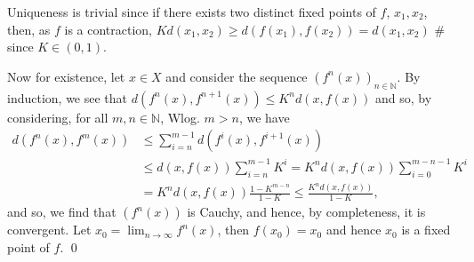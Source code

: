 \documentclass[
]{article}
\theoremstyle{definition}
\theoremstyle{definition}
\begin{document}
Uniqueness is trivial since if there exists two distinct fixed points of
\(f\), \(x_1, x_2\), then, as \(f\) is a contraction,
\(K d(x_1, x_2) \ge  d(f(x_1), f(x_2)) = d(x_1, x_2)\) \# since
\(K \in (0, 1)\).

Now for existence, let \(x \in X\) and consider the sequence
\((f^n(x))_{n \in \mathbb{N}}\). By induction, we see that
\(d(f^n(x), f^{n + 1}(x)) \le K^nd(x, f(x))\) and so, by considering,
for all \(m, n \in \mathbb{N}\), Wlog. \(m > n\), we have \begin{align*}
    d(f^n(x), f^m(x)) & \le \sum_{i = n}^{m - 1} d(f^i(x), f^{i + 1}(x)) \\
      & \le d(x, f(x)) \sum_{i = n}^{m - 1} K^i = K^n d(x, f(x)) \sum_{i = 0}^{m - n - 1} K^i\\
      & = K^n d(x, f(x))\frac{1 - K^{m - n}}{1 - K} \le \frac{K^n d(x, f(x))}{1 - K},
  \end{align*} and so, we find that \((f^n(x))\) is Cauchy, and hence,
by completeness, it is convergent. Let
\(x_0 = \lim_{n \to \infty} f^n(x)\), then \(f(x_0) = x_0\) and hence
\(x_0\) is a fixed point of \(f\). \qed
\end{document}
